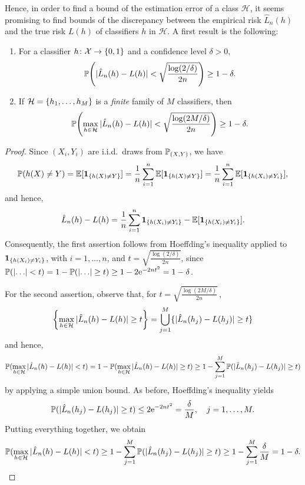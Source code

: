 Hence, in order to find a bound of the estimation error of a class $\mathcal{H}$, it seems promising to find bounds of the discrepancy between the empirical risk $\hat{L}_n(h)$ and the true risk $L(h)$ of classifiers $h$ in $\mathcal{H}$. A first result is the following:

\begin{theorem}
\label{thm: empirical vs true risk}
\begin{enumerate}
    \item For a classifier $h \colon \mathcal{X} \to \set{0, 1}$ and a confidence level $\delta > 0$,
    \[
        \Prob\left(\abs*{\hat{L}_n(h) - L(h)} < \sqrt{\frac{\log(2 / \delta)}{2n}}\right) \geq 1 - \delta.
    \]

    \item If $\mathcal{H} = \set{h_1, \dots, h_M}$ is a \emph{finite} family of $M$ classifiers, then
    \[
        \Prob\left(\max_{h \in \mathcal{H}} \abs*{\hat{L}_n(h) - L(h)} < \sqrt{\frac{\log(2M / \delta)}{2n}}\right) \geq 1 - \delta.
    \]
\end{enumerate}
\end{theorem}

\begin{proof}
Since $(X_i, Y_i)$ are i.i.d.\ draws from $\P_{(X, Y)}$, we have
\[
    \Prob(h(X) \neq Y) = \Exp[\indSet{h(X) \neq Y}] = \frac{1}{n} \sum_{i=1}^n \Exp[\indSet{h(X) \neq Y}] = \frac{1}{n} \sum_{i=1}^n \Exp[\indSet{h(X_i) \neq Y_i}],
\]
and hence,
\[
    \hat{L}_n(h) - L(h) = \frac{1}{n} \sum_{i=1}^n \indSet{h(X_i) \neq Y_i} - \Exp[\indSet{h(X_i) \neq Y_i}].
\]
Consequently, the first assertion follows from Hoeffding's inequality applied to $\indSet{h(X_i) \neq Y_i}$, with $i = 1, \dots, n$, and $t = \sqrt{\frac{\log(2 / \delta)}{2n}}$, since $\Prob(\abs{\ldots} < t) = 1 - \Prob(\abs{\ldots} \geq t) \geq 1 - 2\e^{-2nt^2} = 1 - \delta$.

For the second assertion, observe that, for $t = \sqrt{\frac{\log(2M/\delta)}{2n}} \,$,
\[
    \set{\max_{h \in \mathcal{H}} \abs*{\hat{L}_n(h) - L(h)} \geq t} = \bigcup_{j=1}^M \{\abs*{\hat{L}_n(h_j) - L(h_j)} \geq t\}
\]
and hence,
\[
    \Prob(\max_{h \in \mathcal{H}} \abs*{\hat{L}_n(h) - L(h)} < t) = 1 - \Prob(\max_{h \in \mathcal{H}} \abs*{\hat{L}_n(h) - L(h)} \geq t) \geq 1 - \sum_{j=1}^M \Prob(\abs*{\hat{L}_n(h_j) - L(h_j)} \geq t)
\]
by applying a simple union bound. As before, Hoeffding's inequality yields
\[
    \Prob(\abs*{\hat{L}_n(h_j) - L(h_j)} \geq t) \leq 2 \e^{-2nt^2} = \frac{\delta}{M}, \quad j = 1, \dots, M.
\]
Putting everything together, we obtain
\[
    \Prob(\max_{h \in \mathcal{H}} \abs*{\hat{L}_n(h) - L(h)} < t) \geq 1 - \sum_{j=1}^M \Prob(\abs*{\hat{L}_n(h_j) - L(h_j)} \geq t) \geq 1 - \sum_{j=1}^M \frac{\delta}{M} = 1 - \delta. \qedhere
\]
\end{proof}

